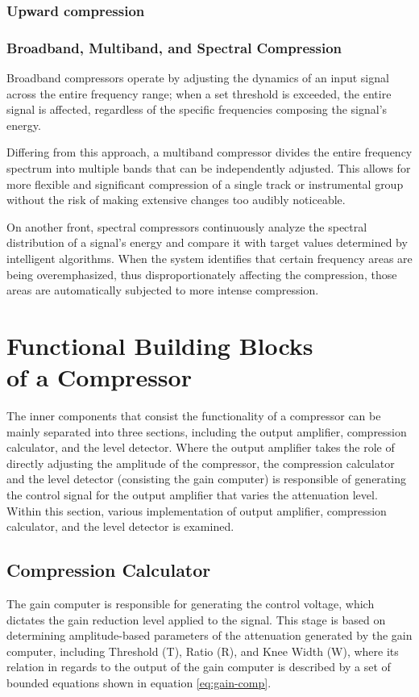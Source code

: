 \documentclass[10pt]{article}
\begin{document}
\begin{multicols*}{2}
                \subsubsection{Upward compression}
        
                \subsubsection{Broadband, Multiband, and Spectral Compression}
                    Broadband compressors operate by adjusting the dynamics of an input signal across the entire frequency range; when a set threshold is exceeded, the entire signal is affected, regardless of the specific frequencies composing the signal's energy.\par
                    Differing from this approach, a multiband compressor divides the entire frequency spectrum into multiple bands that can be independently adjusted. This allows for more flexible and significant compression of a single track or instrumental group without the risk of making extensive changes too audibly noticeable. \par
                    On another front, spectral compressors continuously analyze the spectral distribution of a signal's energy and compare it with target values determined by intelligent algorithms. When the system identifies that certain frequency areas are being overemphasized, thus disproportionately affecting the compression, those areas are automatically subjected to more intense compression.

        \section[Functional Building Blocks of a Compressor]{Functional Building Blocks\\of a Compressor}
            The inner components that consist the functionality of a compressor can be mainly separated into three sections, including the output amplifier, compression calculator, and the level detector. Where the output amplifier takes the role of directly adjusting the amplitude of the compressor, the compression calculator and the level detector (consisting the gain computer) is responsible of generating the control signal for the output amplifier that varies the attenuation level. Within this section, various implementation of output amplifier, compression calculator, and the level detector is examined.

            \subsection{Compression Calculator}
                The gain computer is responsible for generating the control voltage, which dictates the gain reduction level applied to the signal. This stage is based on determining amplitude-based parameters of the attenuation generated by the gain computer, including Threshold (T), Ratio (R), and Knee Width (W), where its relation in regards to the output of the gain computer is described by a set of bounded equations shown in equation \ref{eq:gain-comp}.


\end{multicols*}
\end{document}
